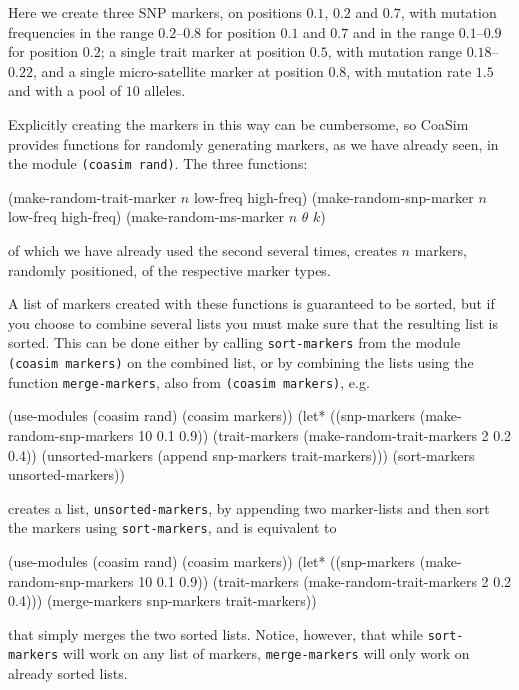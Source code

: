 \documentclass{manual}
\begin{document}
\begin{empfile}
Here we create three SNP markers, on positions $0.1$, $0.2$ and $0.7$,
with mutation frequencies in the range $0.2$--$0.8$ for position
$0.1$ and $0.7$ and in the range $0.1$--$0.9$ for position $0.2$; a
single trait marker at position $0.5$, with mutation range
$0.18$--$0.22$, and a single micro-satellite marker at position $0.8$,
with mutation rate $1.5$ and with a pool of $10$ alleles.

Explicitly creating the markers in this way can be cumbersome, so
CoaSim provides functions for randomly generating markers, as we have
already seen, in the module \texttt{(coasim rand)}.  The three
functions:
\begin{code}
(make-random-trait-marker \(n\) low-freq high-freq)
(make-random-snp-marker   \(n\) low-freq high-freq)
(make-random-ms-marker    \(n\) \(\theta\) \(k\))
\end{code}
of which we have already used the second several times, creates $n$
markers, randomly positioned, of the respective marker types.

A list of markers created with these functions is guaranteed to be
sorted, but if you choose to combine several lists you must make sure
that the resulting list is sorted.  This can be done either by calling
\texttt{sort-markers} from the module \texttt{(coasim markers)} on the
combined list, or by combining the lists using the function
\texttt{merge-markers}, also from \texttt{(coasim markers)}, e.g.\
\begin{code}
(use-modules (coasim rand) (coasim markers))
(let* ((snp-markers   (make-random-snp-markers   10 0.1 0.9))
       (trait-markers (make-random-trait-markers  2 0.2 0.4))
       (unsorted-markers (append snp-markers trait-markers)))
  (sort-markers unsorted-markers))
\end{code}
creates a list, \texttt{unsorted-markers}, by appending two marker-lists
and then sort the markers using \texttt{sort-markers}, and is
equivalent to 
\begin{code}
(use-modules (coasim rand) (coasim markers))
(let* ((snp-markers   (make-random-snp-markers   10 0.1 0.9))
       (trait-markers (make-random-trait-markers  2 0.2 0.4)))
  (merge-markers snp-markers trait-markers))
\end{code}
that simply merges the two sorted lists.  Notice, however, that while
\texttt{sort-markers} will work on any list of markers,
\texttt{merge-markers} will only work on already sorted lists.


\end{empfile}
\end{document}
